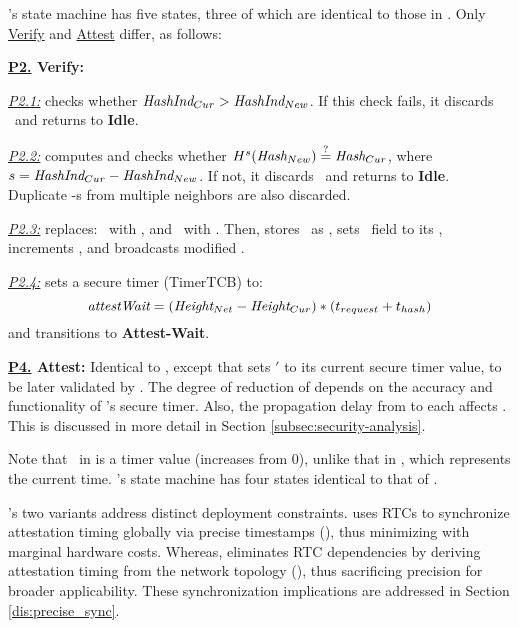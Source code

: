 \prv's state machine has five states, three of which are identical to those in \trapsrtc.
Only {\underline{Verify}} and {\underline{Attest}} differ, as follows:
\begin{compactitem}[]
    \item {\bf \underline{\bf P2.} Verify:} 
    \begin{compactitem}[]
        \item \underline{\it P2.1:}  \prv checks whether $\textit {HashInd$_{Cur}$}>\textit {HashInd$_{New}$}$.    
        If this check fails, it discards \Attreq\ and returns to {\bf Idle}.
        \item \underline{\it P2.2:} \prv 
        computes and checks whether $H^s(\textit{Hash$_{New}$}) \stackrel{?}{=} \textit{Hash$_{Cur}$}$, where 
        $s=\textit {HashInd$_{Cur}$}-\textit {HashInd$_{New}$}$. If not, it discards \Attreq\ and returns to {\bf Idle}.
        Duplicate \Attreq-s from multiple neighbors are also discarded. 
        \item  \underline{\it P2.3:} \prv replaces: \curhash\ with \hash, and \curhashind\ with \hashind. Then, \prv stores \snd\ as \parent, 
        sets \snd\ field to its \devid, increments \height{}, and broadcasts modified \Attreq. 
        \item \underline{\it P2.4:} \prv sets a secure timer (TimerTCB) to: 
        \begin{equation}
            \textit{attestWait} = (\textit{Height$_{Net}$}-\textit{Height$_{Cur}$})*({t_{request}} + {t_{hash}})
        \end{equation}
        and transitions to \textbf{Attest-Wait}.
    \end{compactitem}
%
    \item {\bf \underline{\bf P4.} Attest:} Identical to \trapsrtc, except that \prv sets {\it \attesttime$'$} 
    to its current secure timer value, to be later validated by \vrf.
    The degree of reduction of \toctousa depends on the accuracy and functionality of \prv's secure timer.
    Also, the propagation delay from \vrf to each \prv affects \toctousa.
    This is discussed in more detail in Section \ref{subsec:security-analysis}.
%
\end{compactitem}
%
Note that \attesttime\ in \trapsnortc is a timer value (increases from 0),
unlike that in \trapsrtc, which represents the current time.
\vrf's state machine has four states identical to that of \trapsrtc.

 \system's two variants address distinct deployment 
constraints. \trapsrtc uses RTCs to synchronize attestation timing globally via precise 
timestamps (\attesttime), thus minimizing \toctousa with marginal hardware costs.
Whereas, \trapsnortc eliminates RTC dependencies by deriving attestation timing from the 
network topology (\netheight), thus sacrificing \toctousa precision for broader applicability.
These synchronization implications are addressed in Section \ref{dis:precise_sync}.

